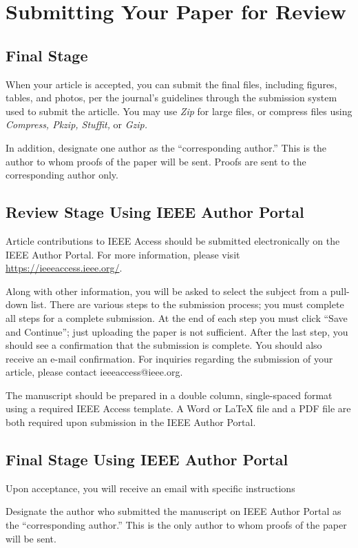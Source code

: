 \documentclass{ieeeaccess}
\begin{document}
\section{\break Submitting Your Paper for Review}

\subsection{Final Stage}
When your article is accepted, you can submit the final files, including figures, tables, and photos, per the journal's guidelines through the submission system used to submit the articlle.
You may use \emph{Zip} for large files, or compress files using \emph{Compress, Pkzip, Stuffit,} or \emph{Gzip.}

In addition, designate one author as the ``corresponding author.'' This is the author to
whom proofs of the paper will be sent. Proofs are sent to the corresponding
author only.

\subsection{Review Stage Using IEEE Author Portal}
Article contributions to IEEE Access should be submitted electronically on the IEEE Author Portal. For more information, please visit
\underline{https://ieeeaccess.ieee.org/}.

Along with other information, you will be asked to select the subject from a
pull-down list. There are various steps to the
submission process; you must complete all steps for a complete submission.
At the end of each step you must click ``Save and Continue''; just uploading
the paper is not sufficient. After the last step, you should see a
confirmation that the submission is complete. You should also receive an
e-mail confirmation. For inquiries regarding the submission of your article, please contact ieeeaccess@ieee.org.

The manuscript should be prepared in a double column, single-spaced format using a required IEEE Access template.
A Word or LaTeX file and a PDF file are both required upon submission in the IEEE Author Portal.

\subsection{Final Stage Using IEEE Author Portal}
Upon acceptance, you will receive an email with specific instructions

Designate the author who submitted the manuscript on
IEEE Author Portal as the ``corresponding author.'' This is the only
author to whom proofs of the paper will be sent.
\end{document}
